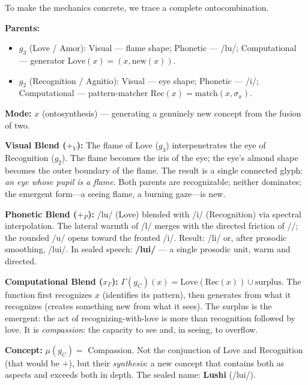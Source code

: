 \documentclass[12pt, letterpaper]{book}
\def\equiv{=}%
\def\otimes{x}%
\def\oplus{+}%
\def\mathfrak#1{#1}%
\begin{document}
To make the mechanics concrete, we trace a complete ontocombination.

\noindent\textbf{Parents:}
\begin{itemize}
    \item $\mathfrak{g}_3$ (Love / Amor): Visual --- flame shape; Phonetic --- /lu/; Computational --- generator $\mathrm{Love}(x) \equiv (x, \mathrm{new}(x))$.
    \item $\mathfrak{g}_2$ (Recognition / Agnitio): Visual --- eye shape; Phonetic --- /\textesh i/; Computational --- pattern-matcher $\mathrm{Rec}(x) \equiv \mathrm{match}(x, \sigma_x)$.
\end{itemize}

\noindent\textbf{Mode:} $\otimes$ (ontosynthesis) --- generating a genuinely new concept from the fusion of two.

\noindent\textbf{Visual Blend ($\oplus_V$):} The flame of Love ($\mathfrak{g}_3$) interpenetrates the eye of Recognition ($\mathfrak{g}_2$). The flame becomes the iris of the eye; the eye's almond shape becomes the outer boundary of the flame. The result is a single connected glyph: \textit{an eye whose pupil is a flame}. Both parents are recognizable; neither dominates; the emergent form---a seeing flame, a burning gaze---is new.

\noindent\textbf{Phonetic Blend ($\oplus_P$):} /lu/ (Love) blended with /\textesh i/ (Recognition) via spectral interpolation. The lateral warmth of /l/ merges with the directed friction of /\textesh/; the rounded /u/ opens toward the fronted /i/. Result: /l\textesh i/ or, after prosodic smoothing, /lu\textesh i/. In sealed speech: \textbf{/lu\textesh i/} --- a single prosodic unit, warm and directed.

\noindent\textbf{Computational Blend ($\otimes_\Gamma$):} $\Gamma(\mathfrak{g}_C)(x) \equiv \mathrm{Love}(\mathrm{Rec}(x)) \cup \mathrm{surplus}$. The function first recognizes $x$ (identifies its pattern), then generates from what it recognizes (creates something new from what it sees). The surplus is the emergent: the act of recognizing-with-love is more than recognition followed by love. It is \textit{compassion}: the capacity to see and, in seeing, to overflow.

\noindent\textbf{Concept:} $\mu(\mathfrak{g}_C) \equiv$ Compassion. Not the conjunction of Love and Recognition (that would be $\oplus$), but their \textit{synthesis}: a new concept that contains both as aspects and exceeds both in depth. The sealed name: \textbf{Lushi} (/lu\textesh i/).
\end{document}

